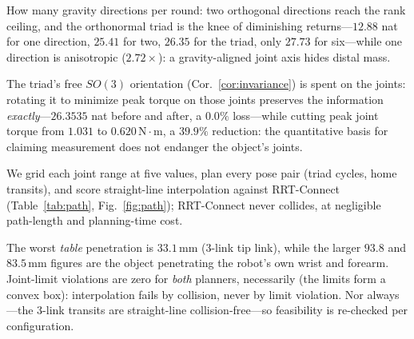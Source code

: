 


How many gravity directions per round: two orthogonal directions reach the
rank ceiling, and the orthonormal triad is the knee of diminishing
returns---$12.88$ nat for one direction, $25.41$ for two, $26.35$ for the
triad, only $27.73$ for six---while one direction is anisotropic
($2.72\times$): a gravity-aligned joint axis hides distal mass.

The triad's free $SO(3)$ orientation (Cor.~\ref{cor:invariance}) is spent on
the joints: rotating it to minimize peak torque on those joints preserves
the information \emph{exactly}---$26.3535$ nat before and
after, a $0.0\%$ loss---while cutting peak joint torque from $1.031$ to
$0.620\,\mathrm{N\cdot m}$, a $39.9\%$ reduction: the quantitative basis for
claiming measurement does not endanger the object's joints.

We grid each joint range at five values, plan every pose pair (triad cycles,
home transits), and score straight-line interpolation against RRT-Connect
(Table~\ref{tab:path}, Fig.~\ref{fig:path}); RRT-Connect never collides, at
negligible path-length and planning-time cost.

The worst \emph{table} penetration is
$33.1\,\mathrm{mm}$ (3-link tip link), while the larger $93.8$ and
$83.5\,\mathrm{mm}$ figures are the object penetrating the robot's own wrist
and forearm. Joint-limit violations are zero for \emph{both} planners, necessarily (the
limits form a convex box): interpolation fails by collision, never by limit
violation. Nor always---the 3-link transits are straight-line
collision-free---so feasibility is re-checked per configuration.



